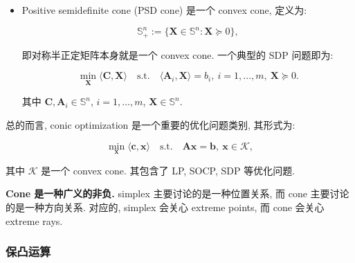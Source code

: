 \begin{defblock}
\begin{itemize}
\item {}Positive semidefinite cone (PSD cone) 是一个 convex cone, 定义为:

\[
\mathbb{S}_+^n := \{\bm{X} \in \mathbb{S}^n: \bm{X} \succeq 0\},
\]

即对称半正定矩阵本身就是一个 convex cone. 一个典型的 SDP 问题即为:

\[
\min_{\bm{X}} \langle \bm{C}, \bm{X} \rangle \quad \text{s.t.} \quad \langle \bm{A}_i, \bm{X} \rangle = b_i,~ i=1,\ldots,m,~ \bm{X} \succeq 0.
\]

其中 $\bm{C}, \bm{A}_i \in \mathbb{S}^n$, $i=1,\ldots,m$, $\bm{X} \in \mathbb{S}^n$.


\end{itemize}

\end{defblock}

总的而言, conic optimization 是一个重要的优化问题类别, 其形式为:

\[
\min_{\bm{x}} \langle \bm{c}, \bm{x} \rangle \quad \text{s.t.} \quad \bm{A}\bm{x} = \bm{b},~ \bm{x} \in \mathcal{K},
\]

其中 $\mathcal{K}$ 是一个 convex cone. 其包含了 LP, SOCP, SDP 等优化问题.

\textbf{Cone 是一种广义的非负.} simplex 主要讨论的是一种位置关系, 而 cone 主要讨论的是一种方向关系. 对应的, simplex 会关心 extreme points, 而 cone 会关心 extreme rays.

\subsubsection{保凸运算}


